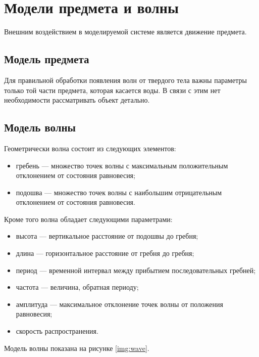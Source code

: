 \section{Модели предмета и волны}

Внешним воздействием в моделируемой системе является движение предмета.

\subsection{Модель предмета}

Для правильной обработки появления волн от твердого тела важны параметры только той части предмета, которая касается воды. В связи с этим нет необходимости рассматривать объект детально.

\subsection{Модель волны}

Геометрически волна состоит из следующих элементов:

\begin{itemize}
	\item гребень --- множество точек волны с максимальным положительным отклонением от состояния равновесия;
	\item подошва --- множество точек волны с наибольшим отрицательным отклонением от состояния равновесия.
\end{itemize}

Кроме того волна обладает следующими параметрами:

\begin{itemize}
	\item высота --- вертикальное расстояние от подошвы до гребня;
	\item длина --- горизонтальное расстояние от гребня до гребня;
	\item период --- временной интервал между прибытием последовательных гребней;
	\item частота --- величина, обратная периоду;
	\item амплитуда --- максимальное отклонение точек волны от положения равновесия;
	\item скорость распространения.
\end{itemize}

Модель волны показана на рисунке \ref{img:wave}.

